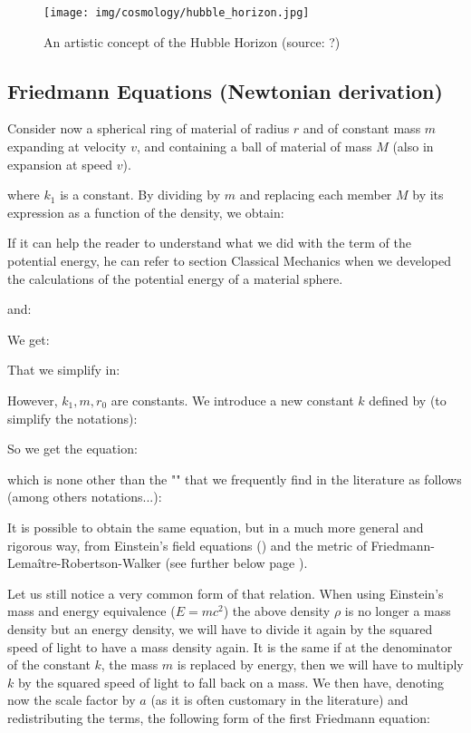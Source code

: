 	\begin{figure}[H]
		\centering
		\texttt{[image: img/cosmology/hubble\_horizon.jpg]}	
		\caption{An artistic concept of the Hubble Horizon (source: ?)}
	\end{figure}
	
	\subsection{Friedmann Equations (Newtonian derivation)}
	Consider now a spherical ring of material of radius $r$ and of constant mass $m$ expanding at velocity $v$, and containing a ball of material of mass $M$ (also in expansion at speed $v$).
	
	where $k_1$ is a constant. By dividing by $m$ and replacing each member $M$ by its expression as a function of the density, we obtain:
	
	\begin{tcolorbox}[title=Remark,colframe=black,arc=10pt]
	If it can help the reader to understand what we did with the term of the potential energy, he can refer to section Classical Mechanics when we developed the calculations of the potential energy of a material sphere.
	\end{tcolorbox}
	
	and:
	
	We get:
	
	That we simplify in:
	
	However, $k_1,m,r_0$ are constants. We introduce a new constant $k$ defined by (to simplify the notations):
	
	So we get the equation:
	
	which is none other than the "" that we frequently find in the literature as follows (among others notations...):
	
	It is possible to obtain the same equation, but in a much more general and rigorous way, from Einstein's field equations () and the metric of Friedmann-Lemaître-Robertson-Walker (see further below page \pageref{Friedmann-Lemaître-Robertson-Walker Cosmological Models}).
	
	Let us still notice a very common form of that relation. When using Einstein's mass and energy equivalence ($E=mc^2$) the above density $\rho$ is no longer a mass density but an energy density, we will have to divide it again by the squared speed of light to have a mass density again. It is the same if at the denominator of the constant $k$, the mass $m$ is replaced by energy, then we will have to multiply $k$ by the squared speed of light to fall back on a mass. We then have, denoting now the scale factor by $a$ (as it is often customary in the literature) and redistributing the terms, the following form of the first Friedmann equation:
	
